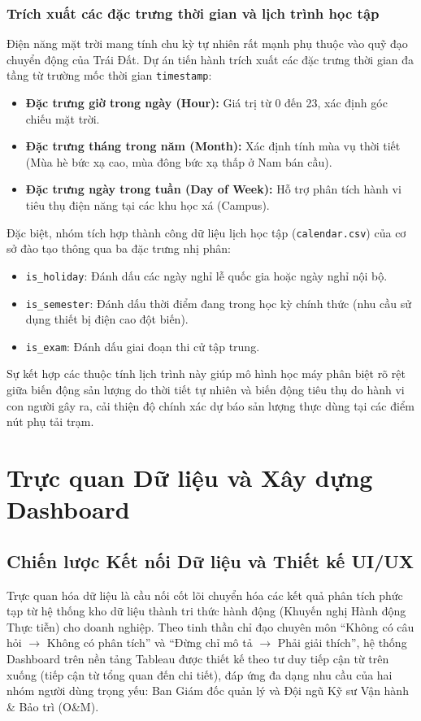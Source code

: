 \documentclass[12pt, a4paper]{report}
\begin{document}
\subsection{Trích xuất các đặc trưng thời gian và lịch trình học tập}
Điện năng mặt trời mang tính chu kỳ tự nhiên rất mạnh phụ thuộc vào quỹ đạo chuyển động của Trái Đất. Dự án tiến hành trích xuất các đặc trưng thời gian đa tầng từ trường mốc thời gian \texttt{timestamp}:
\begin{itemize}
    \item \textbf{Đặc trưng giờ trong ngày (Hour):} Giá trị từ 0 đến 23, xác định góc chiếu mặt trời.
    \item \textbf{Đặc trưng tháng trong năm (Month):} Xác định tính mùa vụ thời tiết (Mùa hè bức xạ cao, mùa đông bức xạ thấp ở Nam bán cầu).
    \item \textbf{Đặc trưng ngày trong tuần (Day of Week):} Hỗ trợ phân tích hành vi tiêu thụ điện năng tại các khu học xá (Campus).
\end{itemize}

Đặc biệt, nhóm tích hợp thành công dữ liệu lịch học tập (\texttt{calendar.csv}) của cơ sở đào tạo thông qua ba đặc trưng nhị phân:
\begin{itemize}
    \item \texttt{is\_holiday}: Đánh dấu các ngày nghỉ lễ quốc gia hoặc ngày nghỉ nội bộ.
    \item \texttt{is\_semester}: Đánh dấu thời điểm đang trong học kỳ chính thức (nhu cầu sử dụng thiết bị điện cao đột biến).
    \item \texttt{is\_exam}: Đánh dấu giai đoạn thi cử tập trung.
\end{itemize}
Sự kết hợp các thuộc tính lịch trình này giúp mô hình học máy phân biệt rõ rệt giữa biến động sản lượng do thời tiết tự nhiên và biến động tiêu thụ do hành vi con người gây ra, cải thiện độ chính xác dự báo sản lượng thực dùng tại các điểm nút phụ tải trạm.

\newpage
\chapter{Trực quan Dữ liệu và Xây dựng Dashboard}
\label{chap:dashboard}

\section{Chiến lược Kết nối Dữ liệu và Thiết kế UI/UX}
\label{sec:dashboard_strategy}

Trực quan hóa dữ liệu là cầu nối cốt lõi chuyển hóa các kết quả phân tích phức tạp từ hệ thống kho dữ liệu thành tri thức hành động (Khuyến nghị Hành động Thực tiễn) cho doanh nghiệp. Theo tinh thần chỉ đạo chuyên môn ``Không có câu hỏi $\rightarrow$ Không có phân tích'' và ``Đừng chỉ mô tả $\rightarrow$ Phải giải thích'', hệ thống Dashboard trên nền tảng Tableau được thiết kế theo tư duy tiếp cận từ trên xuống (tiếp cận từ tổng quan đến chi tiết), đáp ứng đa dạng nhu cầu của hai nhóm người dùng trọng yếu: Ban Giám đốc quản lý và Đội ngũ Kỹ sư Vận hành \& Bảo trì (O\&M).
\end{document}
